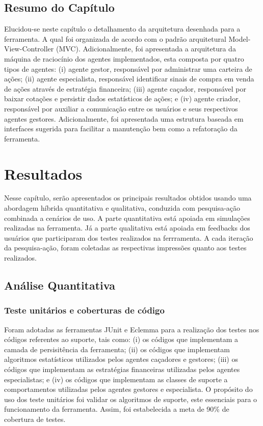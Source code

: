 \section{Resumo do Capítulo}

Elucidou-se neste capítulo o detalhamento da arquitetura desenhada para a ferramenta. A qual foi organizada de acordo com o padrão arquitetural Model-View-Controller (MVC). Adicionalmente, foi apresentada a arquitetura da máquina de raciocínio dos agentes implementados, esta composta por quatro tipos de agentes: (i) agente gestor, responsável por administrar uma carteira de ações; (ii) agente especialista, responsável identificar sinais de compra em venda de ações através de estratégia financeira; (iii) agente caçador,  responsável por baixar cotações e persistir dados estatísticos de ações; e (iv) agente criador, responsável por auxiliar a comunicação entre os usuários e seus respectivos agentes gestores.
Adicionalmente, foi apresentada uma estrutura baseada em interfaces sugerida para facilitar a manutenção bem como a refatoração da ferramenta.  


\newpage
\chapter[RESULTADOS]{Resultados}

Nesse capítulo, serão apresentados os principais resultados obtidos usando uma abordagem híbrida quantitativa e qualitativa, conduzida com pesquisa-ação combinada a cenários de uso. A parte quantitativa está apoiada em simulações realizadas na ferramenta. Já a parte qualitativa está apoiada em feedbacks dos usuários que participaram dos testes realizados na ferrramenta. A cada iteração da pesquisa-ação, foram coletadas as respectivas impressões quanto aos testes realizados.

\section{Análise Quantitativa}
\subsection{Teste unitários e coberturas de código}

Foram adotadas as ferramentas JUnit e Eclemma para a realização dos testes nos códigos referentes ao suporte, tais como: (i) os códigos que implementam a camada de persisitência da ferramenta; (ii) os códigos que implementam algoritmos estatísticos utilizados pelos agentes caçadores e gestores; (iii) os códigos que implementam as estratégias financeiras utilizadas pelos agentes especialistas; e (iv) os códigos que implementam as classes de suporte a comportamentos utilizadas pelos agentes gestores e especialista. O propósito do uso dos teste unitários foi validar os algoritmos de suporte, este essenciais para o funcionamento da ferramenta. Assim, foi estabelecida a meta de 90\% de cobertura de testes.


